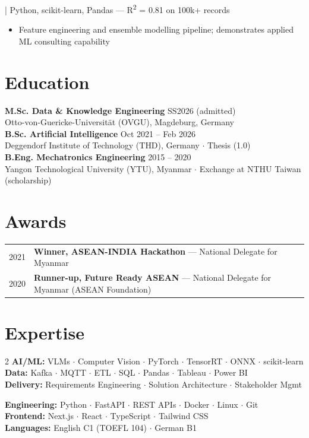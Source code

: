 \documentclass[10pt,a4paper]{article}
\newcommand{\project}[2]{%
  \noindent{\small\bfseries #1} {\footnotesize\color{lightgray}| #2}
}
\begin{document}
\project{Chess ELO Prediction}{Python, scikit-learn, Pandas — R\textsuperscript{2} = 0.81 on 100k+ records}
\begin{itemize}\small
  \item Feature engineering and ensemble modelling pipeline; demonstrates applied ML consulting capability
\end{itemize}

\section{Education}
\small\noindent
{\bfseries M.Sc. Data \& Knowledge Engineering} \hfill {\color{lightgray} SS2026 (admitted)}\\[-2pt]
{\color{accent}Otto-von-Guericke-Universität (OVGU)}, Magdeburg, Germany\\[2pt]
{\bfseries B.Sc. Artificial Intelligence} \hfill {\color{lightgray} Oct 2021 -- Feb 2026}\\[-2pt]
{\color{accent}Deggendorf Institute of Technology (THD)}, Germany $\cdot$ Thesis (1.0)\\[2pt]
{\bfseries B.Eng. Mechatronics Engineering} \hfill {\color{lightgray} 2015 -- 2020}\\[-2pt]
{\color{accent}Yangon Technological University (YTU)}, Myanmar $\cdot$ Exchange at NTHU Taiwan (scholarship)

\section{Awards}
\small\noindent
\begin{tabularx}{\textwidth}{@{}lX@{}}
2021 & \textbf{Winner, ASEAN-INDIA Hackathon} — National Delegate for Myanmar\\[-1pt]
2020 & \textbf{Runner-up, Future Ready ASEAN} — National Delegate for Myanmar (ASEAN Foundation)\\
\end{tabularx}

\section{Expertise}
\begin{multicols}{2}
\small\noindent
{\color{accent}\bfseries AI/ML:} VLMs $\cdot$ Computer Vision $\cdot$ PyTorch $\cdot$ TensorRT $\cdot$ ONNX $\cdot$ scikit-learn\\[1pt]
{\color{accent}\bfseries Data:} Kafka $\cdot$ MQTT $\cdot$ ETL $\cdot$ SQL $\cdot$ Pandas $\cdot$ Tableau $\cdot$ Power BI\\[1pt]
{\color{accent}\bfseries Delivery:} Requirements Engineering $\cdot$ Solution Architecture $\cdot$ Stakeholder Mgmt

\columnbreak
{\color{accent}\bfseries Engineering:} Python $\cdot$ FastAPI $\cdot$ REST APIs $\cdot$ Docker $\cdot$ Linux $\cdot$ Git\\[1pt]
{\color{accent}\bfseries Frontend:} Next.js $\cdot$ React $\cdot$ TypeScript $\cdot$ Tailwind CSS\\[1pt]
{\color{accent}\bfseries Languages:} English C1 (TOEFL 104) $\cdot$ German B1
\end{multicols}
\end{document}
